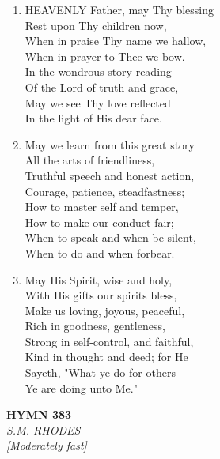 \begin{enumerate}
    \item HEAVENLY Father, may Thy blessing \\
        Rest upon Thy children now, \\
        When in praise Thy name we hallow, \\
        When in prayer to Thee we bow. \\
        In the wondrous story reading \\
        Of the Lord of truth and grace, \\
        May we see Thy love reflected \\
        In the light of His dear face.

    \item May we learn from this great story \\
        All the arts of friendliness, \\
        Truthful speech and honest action, \\
        Courage, patience, steadfastness; \\
        How to master self and temper, \\
        How to make our conduct fair; \\
        When to speak and when be silent, \\
        When to do and when forbear.

    \item May His Spirit, wise and holy, \\
        With His gifts our spirits bless, \\
        Make us loving, joyous, peaceful, \\
        Rich in goodness, gentleness, \\
        Strong in self-control, and faithful, \\
        Kind in thought and deed; for He \\
        Sayeth, "What ye do for others \\
        Ye are doing unto Me."

\end{enumerate}

\newpage
\begin{center}
    {\Large \textbf{HYMN 383}}
    \\
    \textit{S.M. RHODES}
    \\
    \textit{\small [Moderately fast]}
\end{center}
\vspace{1em}


